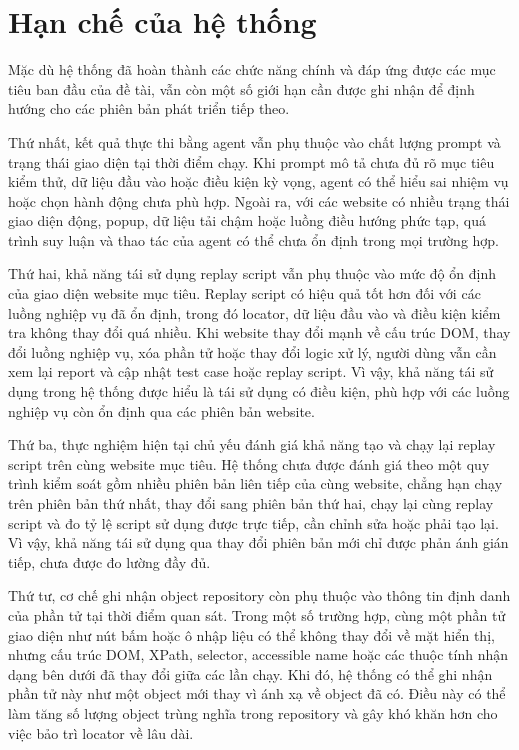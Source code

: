 \section{Hạn chế của hệ thống}

Mặc dù hệ thống đã hoàn thành các chức năng chính và đáp ứng được các mục tiêu ban đầu của đề tài, vẫn còn một số giới hạn cần được ghi nhận để định hướng cho các phiên bản phát triển tiếp theo.

Thứ nhất, kết quả thực thi bằng agent vẫn phụ thuộc vào chất lượng prompt và trạng thái giao diện tại thời điểm chạy. Khi prompt mô tả chưa đủ rõ mục tiêu kiểm thử, dữ liệu đầu vào hoặc điều kiện kỳ vọng, agent có thể hiểu sai nhiệm vụ hoặc chọn hành động chưa phù hợp. Ngoài ra, với các website có nhiều trạng thái giao diện động, popup, dữ liệu tải chậm hoặc luồng điều hướng phức tạp, quá trình suy luận và thao tác của agent có thể chưa ổn định trong mọi trường hợp.

Thứ hai, khả năng tái sử dụng replay script vẫn phụ thuộc vào mức độ ổn định của giao diện website mục tiêu. Replay script có hiệu quả tốt hơn đối với các luồng nghiệp vụ đã ổn định, trong đó locator, dữ liệu đầu vào và điều kiện kiểm tra không thay đổi quá nhiều. Khi website thay đổi mạnh về cấu trúc DOM, thay đổi luồng nghiệp vụ, xóa phần tử hoặc thay đổi logic xử lý, người dùng vẫn cần xem lại report và cập nhật test case hoặc replay script. Vì vậy, khả năng tái sử dụng trong hệ thống được hiểu là tái sử dụng có điều kiện, phù hợp với các luồng nghiệp vụ còn ổn định qua các phiên bản website.

Thứ ba, thực nghiệm hiện tại chủ yếu đánh giá khả năng tạo và chạy lại replay script trên cùng website mục tiêu. Hệ thống chưa được đánh giá theo một quy trình kiểm soát gồm nhiều phiên bản liên tiếp của cùng website, chẳng hạn chạy trên phiên bản thứ nhất, thay đổi sang phiên bản thứ hai, chạy lại cùng replay script và đo tỷ lệ script sử dụng được trực tiếp, cần chỉnh sửa hoặc phải tạo lại. Vì vậy, khả năng tái sử dụng qua thay đổi phiên bản mới chỉ được phản ánh gián tiếp, chưa được đo lường đầy đủ.

Thứ tư, cơ chế ghi nhận object repository còn phụ thuộc vào thông tin định danh của phần tử tại thời điểm quan sát. Trong một số trường hợp, cùng một phần tử giao diện như nút bấm hoặc ô nhập liệu có thể không thay đổi về mặt hiển thị, nhưng cấu trúc DOM, XPath, selector, accessible name hoặc các thuộc tính nhận dạng bên dưới đã thay đổi giữa các lần chạy. Khi đó, hệ thống có thể ghi nhận phần tử này như một object mới thay vì ánh xạ về object đã có. Điều này có thể làm tăng số lượng object trùng nghĩa trong repository và gây khó khăn hơn cho việc bảo trì locator về lâu dài.

